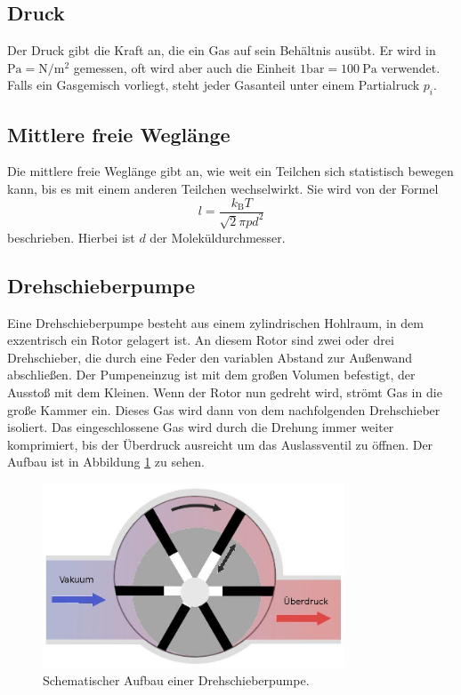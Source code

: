 \subsection{Druck}
Der Druck gibt die Kraft an, die ein Gas auf sein Behältnis ausübt. Er wird in $\si{\pascal}=\si{\newton \per \meter \squared}$ gemessen, oft wird aber auch die Einheit $1 \si{\bar}=\SI{100}{\pascal}$ verwendet. Falls ein Gasgemisch
vorliegt, steht jeder Gasanteil unter einem Partialruck $p_i$.
\subsection{Mittlere freie Weglänge}
Die mittlere freie Weglänge gibt an, wie weit ein Teilchen sich statistisch bewegen kann, bis es mit einem anderen Teilchen wechselwirkt.
Sie wird von der Formel
\begin{equation}
	l=\frac{k_\text{B}T}{\sqrt{2}\pi p d^2}
\end{equation}
beschrieben. Hierbei ist $d$ der Moleküldurchmesser.

\subsection{Drehschieberpumpe}
Eine Drehschieberpumpe besteht aus einem zylindrischen Hohlraum, in dem exzentrisch ein Rotor gelagert ist. An diesem Rotor sind zwei oder drei Drehschieber,
die durch eine Feder den variablen Abstand zur Außenwand abschließen. Der Pumpeneinzug ist mit dem großen Volumen befestigt, der Ausstoß mit dem Kleinen.
Wenn der Rotor nun gedreht wird, strömt Gas in die große Kammer ein. Dieses Gas wird dann von dem nachfolgenden Drehschieber isoliert. Das eingeschlossene Gas wird
durch die Drehung immer weiter komprimiert, bis der Überdruck ausreicht um das Auslassventil zu öffnen. Der Aufbau ist in Abbildung \ref{img:drehpump} zu sehen.
\begin{figure}
	\centering
	\includegraphics[width=0.8\textwidth]{img/drehpump.jpg}
	\caption{Schematischer Aufbau einer Drehschieberpumpe.\cite{hoechs}}
	\label{img:drehpump}
\end{figure}
